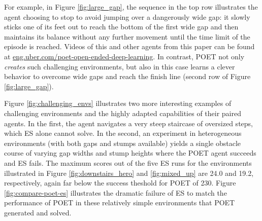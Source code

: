 \documentclass{article}
\newcommand{\jc}[1]{\comments{\textcolor{deepForestGreen}{[JC: #1]}}}
\newcommand{\jl}[1]{\comments{\textcolor{magenta}{[Joel: #1]}}}
\newcommand{\ks}[1]{\comments{\textcolor{purple}{[Ken: #1]}}}
\newcommand{\rw}[1]{\comments{\textcolor{blue}{[Rui: #1]}}}
\newcommand{\comments}[1]{#1}
\begin{document}
For example, in Figure \ref{fig:large_gap}, the sequence in the top row illustrates the agent choosing to stop to avoid jumping over a dangerously wide gap: it slowly sticks one of its feet out to reach the bottom of the first wide gap and then maintains its balance without any further movement until the time limit of the episode is reached.
Videos of this and other agents from this paper can be found at \url{eng.uber.com/poet-open-ended-deep-learning}.
In contrast, POET not only \emph{creates} such challenging environments, but also in this case learns a clever behavior to overcome wide gaps and reach the finish line (second row of Figure \ref{fig:large_gap}). 

Figure \ref{fig:challenging_envs} illustrates two more interesting examples of challenging environments and the highly adapted 
capabilities of their paired agents.   In the first, the agent navigates a very steep staircase of oversized steps, which ES alone cannot solve.  In the second, an experiment in heterogeneous environments (with both gaps and stumps available) yields a single obstacle course of varying gap widths and stump heights where
the POET agent succeeds and ES fails. 
The maximum scores out of the five ES runs for the environments illustrated in Figure \ref{fig:downstairs_hero} and \ref{fig:mixed_up} are 24.0 and 19.2, respectively, again far below the success theshold for POET of 230. Figure \ref{fig:compare-poet-es} illustrates the dramatic failure of ES to match the performance of POET in these relatively simple environments that POET generated and solved.
\end{document}
